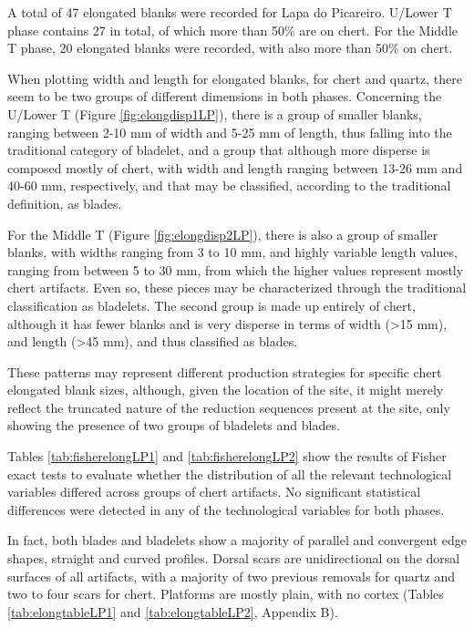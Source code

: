 \documentclass[12pt,twoside]{reedthesis}
\begin{document}
A total of 47 elongated blanks were recorded for Lapa do Picareiro. U/Lower T phase contains 27 in total, of which more than 50\% are on chert. For the Middle T phase, 20 elongated blanks were recorded, with also more than 50\% on chert.

When plotting width and length for elongated blanks, for chert and quartz, there seem to be two groups of different dimensions in both phases. Concerning the U/Lower T (Figure \ref{fig:elongdisp1LP}), there is a group of smaller blanks, ranging between 2-10 mm of width and 5-25 mm of length, thus falling into the traditional category of bladelet, and a group that although more disperse is composed mostly of chert, with width and length ranging between 13-26 mm and 40-60 mm, respectively, and that may be classified, according to the traditional definition, as blades.

For the Middle T (Figure \ref{fig:elongdisp2LP}), there is also a group of smaller blanks, with widths ranging from 3 to 10 mm, and highly variable length values, ranging from between 5 to 30 mm, from which the higher values represent mostly chert artifacts. Even so, these pieces may be characterized through the traditional classification as bladelets. The second group is made up entirely of chert, although it has fewer blanks and is very disperse in terms of width (\textgreater15 mm), and length (\textgreater45 mm), and thus classified as blades.

These patterns may represent different production strategies for specific chert elongated blank sizes, although, given the location of the site, it might merely reflect the truncated nature of the reduction sequences present at the site, only showing the presence of two groups of bladelets and blades.

Tables \ref{tab:fisherelongLP1} and \ref{tab:fisherelongLP2} show the results of Fisher exact tests to evaluate whether the distribution of all the relevant technological variables differed across groups of chert artifacts. No significant statistical differences were detected in any of the technological variables for both phases.

In fact, both blades and bladelets show a majority of parallel and convergent edge shapes, straight and curved profiles. Dorsal scars are unidirectional on the dorsal surfaces of all artifacts, with a majority of two previous removals for quartz and two to four scars for chert. Platforms are mostly plain, with no cortex (Tables \ref{tab:elongtableLP1} and \ref{tab:elongtableLP2}, Appendix B).
\end{document}
